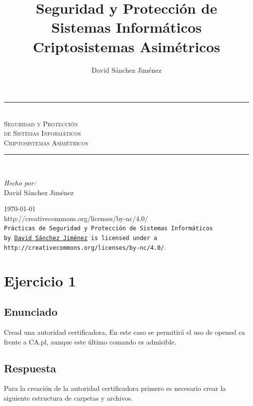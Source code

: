 \documentclass[10pt,a4paper,spanish]{report}
\title{Seguridad y Protección de Sistemas Informáticos \\
Criptosistemas Asimétricos}
\author{David Sánchez Jiménez}
\newcommand{\HRule}{\rule{\linewidth}{0.5mm}} %
\begin{document}
\begin{titlepage}
 \begin{center}
  \HRule \\[0.8cm]
  \textsc{\huge Seguridad y Protección \\ de Sistemas Informáticos \\[0.5cm] Criptosistemas Asimétricos}\\[1.6cm]
  \HRule \\[1cm]
  \begin{flushleft}
   \emph{Hecho por:}\\
   David Sánchez Jiménez
  \end{flushleft}
  \vspace{12cm}
  \large{\today}\\
  \vspace{0.5cm}
  {http://creativecommons.org/licenses/by-nc/4.0/}\\[0.5cm]
  \texttt{Prácticas de Seguridad y Protección de Sistemas Informáticos\\ by
   \href{mailto:dasaji92@gmail.com}{David Sánchez Jiménez} is licensed under a 
   {http://creativecommons.org/licenses/by-nc/4.0/}}.\\[3mm]
 \end{center}
\end{titlepage}

\tableofcontents
\newpage

\chapter{Ejercicio 1}

\section{Enunciado}
\noindent
Cread una autoridad certificadora, En este caso se permitirá el uso de openssl ca frente a CA.pl, aunque este último comando es admisible.

\section{Respuesta}
\noindent
Para la creación de la autoridad certificadora primero es necesario crear la siguiente estructura de carpetas y archivos.
\end{document}
